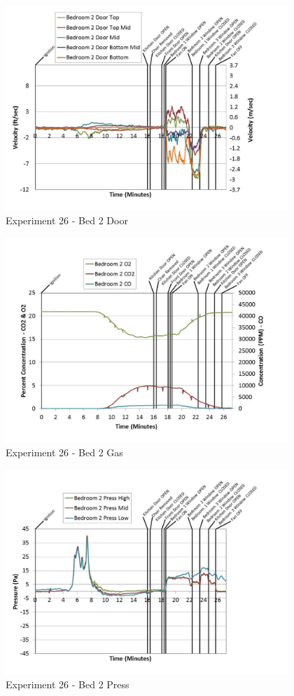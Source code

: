 \documentclass{article}
\begin{document}
\begin{appendices}
	\clearpage

	\begin{figure}[h!]
		\centering
		\includegraphics[height=3.05in]{0_Images/Results_Charts/Exp_26_Charts/Bed2Door.pdf}
		\caption{Experiment 26 - Bed 2 Door}
	\end{figure}
 

	\begin{figure}[h!]
		\centering
		\includegraphics[height=3.05in]{0_Images/Results_Charts/Exp_26_Charts/Bed2Gas.pdf}
		\caption{Experiment 26 - Bed 2 Gas}
	\end{figure}
 
	\clearpage

	\begin{figure}[h!]
		\centering
		\includegraphics[height=3.05in]{0_Images/Results_Charts/Exp_26_Charts/Bed2Press.pdf}
		\caption{Experiment 26 - Bed 2 Press}
	\end{figure}
 


\end{appendices}
\end{document}
